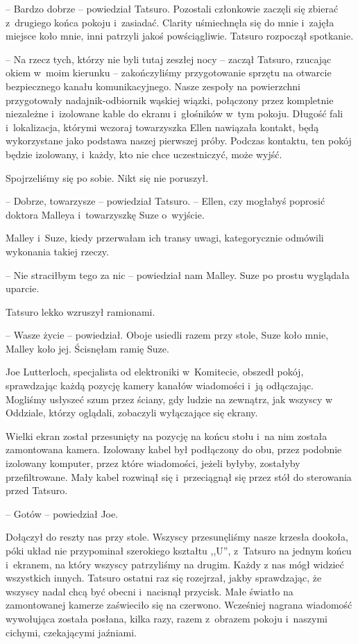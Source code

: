 \documentclass[oneside,polish,11pt,sfheadings]{mwbk}
\begin{document}
-- Bardzo dobrze -- powiedział Tatsuro. Pozostali członkowie zaczęli się
zbierać z~drugiego końca pokoju i~zasiadać. Clarity uśmiechnęła się do
mnie i~zajęła miejsce koło mnie, inni patrzyli jakoś powściągliwie.
Tatsuro rozpoczął spotkanie.

-- Na rzecz tych, którzy nie byli tutaj zeszłej nocy -- zaczął Tatsuro,
rzucając okiem w~moim kierunku -- zakończyliśmy przygotowanie sprzętu na
otwarcie bezpiecznego kanału komunikacyjnego. Nasze zespoły na
powierzchni przygotowały nadajnik-odbiornik wąskiej wiązki, połączony
przez kompletnie niezależne i~izolowane kable do ekranu i~głośników w~tym pokoju. Długość fali i~lokalizacja, którymi wczoraj towarzyszka
Ellen nawiązała kontakt, będą wykorzystane jako podstawa naszej
pierwszej próby. Podczas kontaktu, ten pokój będzie izolowany, i~każdy,
kto nie chce uczestniczyć, może wyjść.

Spojrzeliśmy się po sobie. Nikt się nie poruszył.

-- Dobrze, towarzysze -- powiedział Tatsuro. -- Ellen, czy mogłabyś
poprosić doktora Malleya i~towarzyszkę Suze o~wyjście.

Malley i~Suze, kiedy przerwałam ich transy uwagi, kategorycznie odmówili
wykonania takiej rzeczy.

-- Nie straciłbym tego za nic -- powiedział nam Malley. Suze po prostu
wyglądała uparcie.

Tatsuro lekko wzruszył ramionami. 

-- Wasze życie -- powiedział. Oboje
usiedli razem przy stole, Suze koło mnie, Malley koło jej. Ścisnęłam
ramię Suze.

Joe Lutterloch, specjalista od elektroniki w~Komitecie, obszedł pokój,
sprawdzając każdą pozycję kamery kanałów wiadomości i~ją odłączając.
Mogliśmy usłyszeć szum przez ściany, gdy ludzie na zewnątrz, jak wszyscy
w Oddziale, którzy oglądali, zobaczyli wyłączające się ekrany.

Wielki ekran został przesunięty na pozycję na końcu stołu i~na nim
została zamontowana kamera. Izolowany kabel był podłączony do obu, przez
podobnie izolowany komputer, przez które wiadomości, jeżeli byłyby,
zostałyby przefiltrowane. Mały kabel rozwinął się i~przeciągnął się
przez stół do sterowania przed Tatsuro.

-- Gotów -- powiedział Joe.

Dołączył do reszty nas przy stole. Wszyscy przesunęliśmy nasze krzesła
dookoła, póki układ nie przypominał szerokiego kształtu ,,U'', z~Tatsuro
na jednym końcu i~ekranem, na który wszyscy patrzyliśmy na drugim. Każdy
z nas mógł widzieć wszystkich innych. Tatsuro ostatni raz się rozejrzał,
jakby sprawdzając, że wszyscy nadal chcą być obecni i~nacisnął przycisk.
Małe światło na zamontowanej kamerze zaświeciło się na czerwono.
Wcześniej nagrana wiadomość wywołująca została posłana, kilka razy,
razem z~obrazem pokoju i~naszymi cichymi, czekającymi jaźniami.
\end{document}
